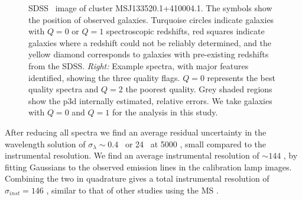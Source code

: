 \begin{figure}[t]
\hfill
{}
    \caption[SDSS \sdssr\ image of cluster MSJ133520.1+410004.1 and spectra quality examples]{SDSS \sdssr\ image of cluster MSJ133520.1+410004.1. The symbols show the position of observed galaxies. Turquoise circles indicate galaxies with $Q=0$ or $Q=1$ spectroscopic redshifts, red squares indicate galaxies where a redshift could not be reliably determined, and the yellow diamond corresponds to galaxies with pre-existing redshifts from the SDSS. \textit{Right:} Example spectra, with major features identified, showing the three quality flags. $Q=0$ represents the best quality spectra and $Q=2$ the poorest quality. Grey shaded regions show the {\sc p3d} internally estimated, relative errors. We take galaxies with $Q=0$ and $Q=1$ for the analysis in this study.} 
	\label{2fig:MSJ133520.1+410004.1}
\end{figure}

After reducing all spectra we find an average residual uncertainty in the wavelength solution of $\sigma_\lambda \sim 0.4$ \AAA\ or 24 \kms\ at 5000 \AAA, small compared to the instrumental resolution. We find an average instrumental resolution of $\sim144$ \kms, by fitting Gaussians to the observed emission lines in the calibration lamp images. Combining the two in quadrature gives a total instrumental resolution of $\sigma_{inst} = 146$ \kms, similar to that of other studies using the MS .

